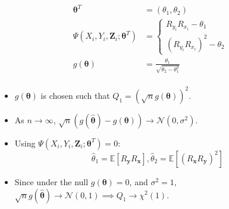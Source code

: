 \documentclass{beamer}
\begin{document}
\begin{frame}
	\frametitle{}
	\begin{equation*}
		\begin{split}
			\bm{\theta}^T &= (\theta_1, \theta_2) \\
			\Psi (X_i, Y_i, \mathbf{Z}_i; \bm{\theta}^T) &= 
				\begin{cases}
					R_{y_i} R_{x_i} - \theta_1 \\
					(R_{y_i} R_{x_i})^2 - \theta_2
				\end{cases} \\
			g(\bm{\theta}) &= \frac{\theta_1}{\sqrt{\theta_2 - \theta_1^2}} \\
		\end{split}
	\end{equation*}



	\begin{itemize}
		\item $ g(\bm{\theta}) $ is chosen such that $ Q_1 = (\sqrt{n} g(\bm{\theta}))^2 $.
		\item As $ n \rightarrow \infty $, $ \sqrt{n} (g(\hat{\bm{\theta}}) - g(\bm{\theta})) \rightarrow \mathcal{N}(0, \sigma^2) $.
		 \item Using $ \Psi(X_i, Y_i, \bm{Z}_i; \bm{\theta}^T) = 0 $: 
		 	$$ \hat{\theta}_1 = \mathbb{E}[R_{\mathbf{y}} R_{\mathbf{x}}], \hat{\theta}_2 = \mathbb{E}[(R_{\mathbf{x}} R_{\mathbf{y}})^2] $$
		\item Since under the null $ g(\bm{\theta}) = 0 $, and $ \sigma^2 = 1 $, $\sqrt{n}g(\hat{\bm{\theta}}) \rightarrow \mathcal{N}(0, 1) \implies Q_1 \to \chi^2(1) $.
	\end{itemize}

\end{frame}
\end{document}
